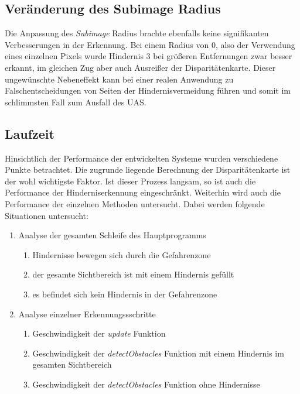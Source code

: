 \subsection{Veränderung des Subimage Radius}
\label{subsec:radius_change_discussion}
\noindent
Die Anpassung des \emph{Subimage} Radius brachte ebenfalls keine signifikanten Verbesserungen in der Erkennung. Bei einem Radius von 0, also der Verwendung eines einzelnen Pixels wurde Hindernis 3 bei größeren Entfernungen zwar besser erkannt, im gleichen Zug aber auch Ausreißer der Disparitätenkarte. Dieser ungewünschte Nebeneffekt kann bei einer realen Anwendung zu Falschentscheidungen von Seiten der Hindernisvermeidung führen und somit im schlimmsten Fall zum Ausfall des UAS. 



\subsection{Laufzeit}
\label{subsec:discussion_performance}

Hinsichtlich der Performance der entwickelten Systeme wurden verschiedene Punkte betrachtet. Die zugrunde liegende Berechnung der Disparitätenkarte ist der wohl wichtigste Faktor. Ist dieser Prozess langsam, so ist auch die Performance der Hinderniserkennung eingeschränkt. Weiterhin wird auch die Performance der einzelnen Methoden untersucht. Dabei werden folgende Situationen untersucht:
\begin{enumerate}
	\item Analyse der gesamten Schleife des Hauptprogramms
	\begin{enumerate}
		\item Hindernisse bewegen sich durch die Gefahrenzone
		\item der gesamte Sichtbereich ist mit einem Hindernis gefüllt
		\item es befindet sich kein Hindernis in der Gefahrenzone
	\end{enumerate}
	\item Analyse einzelner Erkennungssschritte
	\begin{enumerate}
		\item Geschwindigkeit der \emph{update} Funktion
		\item Geschwindigkeit der \emph{detectObstacles} Funktion mit einem Hindernis im gesamten Sichtbereich
		\item Geschwindigkeit der \emph{detectObstacles} Funktion ohne Hindernisse
	\end{enumerate}
\end{enumerate}

